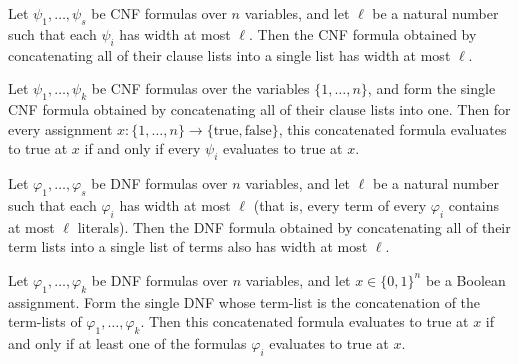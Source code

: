 \begin{lemma}
\label{LMN.cnf_concat_width_le}
\leanok
{}
Let $\psi_1, \dots, \psi_s$ be CNF formulas over $n$ variables, and let $\ell$ be a
natural number such that each $\psi_i$ has width at most $\ell$. Then the CNF formula
obtained by concatenating all of their clause lists into a single list has width at most
$\ell$.
\end{lemma}

\begin{lemma}
\label{LMN.cnf_concat_eval}
\leanok
{}
Let $\psi_1, \dots, \psi_k$ be CNF formulas over the variables $\{1, \dots, n\}$, and
form the single CNF formula obtained by concatenating all of their clause lists into
one. Then for every assignment $x \colon \{1,\dots,n\} \to
\{\text{true},\text{false}\}$, this concatenated formula evaluates to true at $x$ if and
only if every $\psi_i$ evaluates to true at $x$.
\end{lemma}

\begin{lemma}
\label{LMN.dnf_concat_width_le}
\leanok
{}
Let $\varphi_1, \dots, \varphi_s$ be DNF formulas over $n$ variables, and let $\ell$ be
a natural number such that each $\varphi_i$ has width at most $\ell$ (that is, every
term of every $\varphi_i$ contains at most $\ell$ literals). Then the DNF formula
obtained by concatenating all of their term lists into a single list of terms also has
width at most $\ell$.
\end{lemma}

\begin{lemma}
\label{LMN.dnf_concat_eval}
\leanok
{}
Let $\varphi_1, \dots, \varphi_k$ be DNF formulas over $n$ variables, and let $x \in
\{0,1\}^n$ be a Boolean assignment. Form the single DNF whose term-list is the
concatenation of the term-lists of $\varphi_1, \dots, \varphi_k$. Then this concatenated
formula evaluates to true at $x$ if and only if at least one of the formulas $\varphi_i$
evaluates to true at $x$.
\end{lemma}

